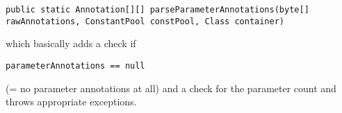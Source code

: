 \documentclass[a4paper, 10pt, titlepage]{scrartcl} %
\begin{document}
\begin{scriptsize}\verb|public|\hspace{0.0pt}\verb| |\hspace{0.0pt}\verb|static|\hspace{0.0pt}\verb| |\hspace{0.0pt}\verb|Annotation|\hspace{0.0pt}\verb|[|\hspace{0.0pt}\verb||\hspace{0.0pt}\verb|]|\hspace{0.0pt}\verb||\hspace{0.0pt}\verb|[|\hspace{0.0pt}\verb||\hspace{0.0pt}\verb|]|\hspace{0.0pt}\verb||\hspace{0.0pt}\verb| |\hspace{0.0pt}\verb|parseParameterAnnotations|\hspace{0.0pt}\verb|(|\hspace{0.0pt}\verb|byte|\hspace{0.0pt}\verb|[|\hspace{0.0pt}\verb||\hspace{0.0pt}\verb|]|\hspace{0.0pt}\verb||\hspace{0.0pt}\verb| |\hspace{0.0pt}\verb|rawAnnotations|\hspace{0.0pt}\verb|,|\hspace{0.0pt}\verb||\hspace{0.0pt}\verb| |\hspace{0.0pt}\verb|ConstantPool|\hspace{0.0pt}\verb| |\hspace{0.0pt}\verb|constPool|\hspace{0.0pt}\verb|,|\hspace{0.0pt}\verb||\hspace{0.0pt}\verb| |\hspace{0.0pt}\verb|Class|\hspace{0.0pt}\verb| |\hspace{0.0pt}\verb|container|\hspace{0.0pt}\verb|)|\hspace{0.0pt}\verb||\end{scriptsize}
which basically adds a check if \begin{scriptsize}\verb|parameterAnnotations|\hspace{0.0pt}\verb| |\hspace{0.0pt}\verb||\hspace{0.0pt}\verb|=|\hspace{0.0pt}\verb||\hspace{0.0pt}\verb|=|\hspace{0.0pt}\verb||\hspace{0.0pt}\verb| |\hspace{0.0pt}\verb|null|\end{scriptsize} (= no parameter
annotations at all) and a check for the parameter count and throws appropriate
exceptions.
\end{document}
